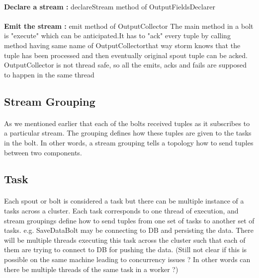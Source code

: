 \documentclass{article}
\begin{document}
    \paragraph{}
    \textbf{Declare a stream :} \textsf{declareStream} method of 
    \textsf{OutputFieldsDeclarer} 
    \paragraph{}
    \textbf{Emit the stream :} emit method of \textsf{OutputCollector}
    The main method in a bolt is "execute" which can be anticipated.It has to "ack"
    every tuple by calling method having same name of \textsf{OutputCollector}that way storm
    knows that the tuple has been processed and then eventually original spout tuple
    can be acked. \textsf{OutputCollector} is not thread safe, so all the emits, acks and fails
    are supposed to happen in the same thread

    \subsection{Stream Grouping}
    \paragraph{}
    As we mentioned earlier that each of the bolts received tuples as it
    subscribes to a particular stream. The grouping defines how these tuples are
    given to the tasks in the bolt. In other words, a stream grouping tells a
    topology how to send tuples between two components.


    \subsection{Task}
    \paragraph{}
    Each spout or bolt is considered a task but there can be multiple instance
    of a tasks across a cluster. Each task corresponds to one thread of
    execution, and stream groupings define how to send tuples from one set of
    tasks to another set of tasks. e.g. SaveDataBolt may be connecting to DB and
    persisting the data. There will be multiple threads executing this task
    across the cluster such that each of them are  trying to connect to DB for
    pushing the data. (Still not clear if this is possible on the same machine
    leading to concurrency issues ? In other words can there be multiple threads
    of the same task in a worker ?)
\end{document}
